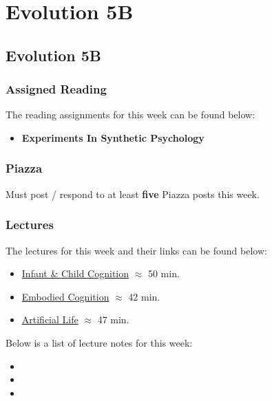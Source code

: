\clearpage

\renewcommand{\ChapTitle}{Evolution 5B}
\renewcommand{\SectionTitle}{Evolution 5B}

\chapter{\ChapTitle}
\section{\SectionTitle}

\subsection{Assigned Reading}

The reading assignments for this week can be found below:

\begin{itemize}
    \item \textbf{Experiments In Synthetic Psychology}
\end{itemize}

\subsection{Piazza}

Must post / respond to at least \textbf{five} Piazza posts this week.

\subsection{Lectures}

The lectures for this week and their links can be found below:

\begin{itemize}
    \item \href{https://www.youtube.com/watch?v=Xiokcbvthu0}{Infant \& Child Cognition} $\approx$ 50 min.
    \item \href{https://www.youtube.com/watch?v=giCTdefUQUQ}{Embodied Cognition} $\approx$ 42 min.
    \item \href{https://www.youtube.com/watch?v=TTR4FLJGOY8}{Artificial Life} $\approx$ 47 min.
\end{itemize}

\noindent Below is a list of lecture notes for this week:

\begin{itemize}
    \item {}
    \item {}
    \item {}
\end{itemize}

